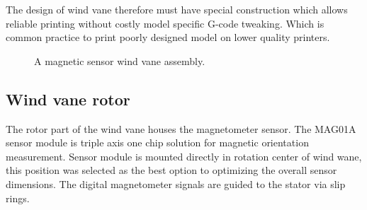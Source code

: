 \documentclass{poster16}
\begin{document}
The design of wind vane therefore must have special construction which allows reliable printing without costly model specific G-code tweaking. Which is common practice to print poorly designed model on lower quality printers. 

\begin{figure}[ht]
\begin{center}
\caption{A magnetic sensor wind vane assembly.} 
\label{fig:printed_parts}
\end{center}
\end{figure}


\subsection{Wind vane rotor}

The rotor part of the wind vane houses the magnetometer sensor. The MAG01A sensor module is triple axis one chip solution for magnetic orientation measurement. Sensor module is mounted directly in rotation center of wind wane, this position was selected as the best option to optimizing the overall sensor dimensions.  The digital magnetometer signals are guided to the stator via slip rings.
\end{document}
